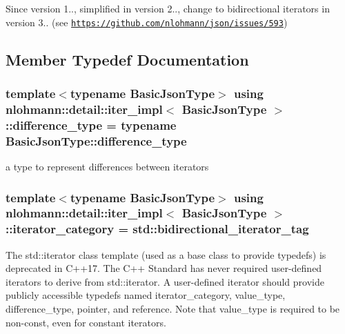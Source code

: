 \begin{DoxySince}{Since}
version 1.., simplified in version 2.., change to bidirectional iterators in version 3.. (see \href{https://github.com/nlohmann/json/issues/593}{\tt https\+://github.\+com/nlohmann/json/issues/593}) 
\end{DoxySince}


\subsection{Member Typedef Documentation}
\subsubsection[{\texorpdfstring{difference\+\_\+type}{difference_type}}]{\setlength{\rightskip}{0pt plus 5cm}template$<$typename Basic\+Json\+Type$>$ using {\bf nlohmann\+::detail\+::iter\+\_\+impl}$<$ Basic\+Json\+Type $>$\+::{\bf difference\+\_\+type} =  typename Basic\+Json\+Type\+::difference\+\_\+type}\hypertarget{classnlohmann_1_1detail_1_1iter__impl_a2f7ea9f7022850809c60fc3263775840}{}\label{classnlohmann_1_1detail_1_1iter__impl_a2f7ea9f7022850809c60fc3263775840}


a type to represent differences between iterators 

\subsubsection[{\texorpdfstring{iterator\+\_\+category}{iterator_category}}]{\setlength{\rightskip}{0pt plus 5cm}template$<$typename Basic\+Json\+Type$>$ using {\bf nlohmann\+::detail\+::iter\+\_\+impl}$<$ Basic\+Json\+Type $>$\+::{\bf iterator\+\_\+category} =  std\+::bidirectional\+\_\+iterator\+\_\+tag}\hypertarget{classnlohmann_1_1detail_1_1iter__impl_ad9e091f5c70b34b5b1abc1ab15fd9106}{}\label{classnlohmann_1_1detail_1_1iter__impl_ad9e091f5c70b34b5b1abc1ab15fd9106}
The std\+::iterator class template (used as a base class to provide typedefs) is deprecated in C++17. The C++ Standard has never required user-\/defined iterators to derive from std\+::iterator. A user-\/defined iterator should provide publicly accessible typedefs named iterator\+\_\+category, value\+\_\+type, difference\+\_\+type, pointer, and reference. Note that value\+\_\+type is required to be non-\/const, even for constant iterators. 
